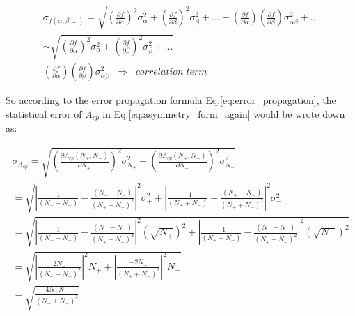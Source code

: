 		\begin{equation}
		\begin{split}
		\sigma_{f(\alpha,\beta,\ldots)} = \sqrt{  (\frac{\partial f}{\partial \alpha})^2 \sigma_{\alpha}^2 + (\frac{\partial f}{\partial \beta})^2 \sigma_{\beta}^2 + \ldots + (\frac{\partial f}{\partial \alpha})(\frac{\partial f}{\partial \beta})\sigma_{\alpha \beta}^2 + \ldots } \\
		\sim \sqrt{  (\frac{\partial f}{\partial \alpha})^2 \sigma_{\alpha}^2 + (\frac{\partial f}{\partial \beta})^2 \sigma_{\beta}^2 + \ldots} \;\;\;\;\;\;\;\;\;\;\;\;\;\;\;\;\;\;\;\;\;\;\;\;\;\;\;\;\;\;\;\;\;\;\; \\
		(\frac{\partial f}{\partial \alpha})(\frac{\partial f}{\partial \beta})\sigma_{\alpha \beta}^2 \;\; \Rightarrow \;\; correlation\;term \;\;\;\;\;\;\;\;\;\;\;\;\;\;\;\;\;\;\;\;\;\;\;\
		\end{split}
		\label{eq:error_propagation}
		\end{equation}
		\FloatBarrier

		So according to the error propagation formula Eq.\ref{eq:error_propagation}, the statistical error of $A_{cp}$ in Eq.\ref{eq:asymmetry_form_again} would be wrote down as:

		\begin{equation}
		\begin{split}
		\sigma_{A_{cp}} = \sqrt{ (\frac{\partial A_{cp}(N_+,N_-)}{\partial N_+})^2 \sigma_{N_+}^2 + (\frac{\partial A_{cp}(N_+,N_-)}{\partial N_-})^2 \sigma_{N_-}^2  } \;\;\;\;\;\;\;\;\;\;\;\;\;\;\;\;\;\;\;\;\;\;\;\;\;\;\;\;\;\;\;\;\;\;\; \\
		= \sqrt{ \left\rvert \frac{1}{(N_+ + N_-)} - \frac{(N_+ - N_-)}{(N_+ + N_-)^2} \right\rvert^2 \sigma_+^2 + \left\rvert \frac{-1}{(N_+ + N_-)} - \frac{(N_+ - N_-)}{(N_+ + N_-)^2} \right\rvert^2 \sigma_-^2 } \;\;\;\;\;\;\;\;\;\;\;\;\;\;\;\; \\
		= \sqrt{ \left\rvert \frac{1}{(N_+ + N_-)} - \frac{(N_+ - N_-)}{(N_+ + N_-)^2} \right\rvert^2 (\sqrt{N_+})^2 + \left\rvert \frac{-1}{(N_+ + N_-)} - \frac{(N_+ - N_-)}{(N_+ + N_-)^2} \right\rvert^2 (\sqrt{N_-})^2 } \\
		= \sqrt{ \left\rvert \frac{2N_-}{(N_+ + N_-)^2} \right\rvert^2 N_+ + \left\rvert \frac{-2N_+}{(N_+ + N_-)^2} \right\rvert^2 N_- } \;\;\;\;\;\;\;\;\;\;\;\;\;\;\;\;\;\;\;\;\;\;\;\;\;\;\;\;\;\;\;\;\;\;\; \\
		= \sqrt{ \frac{4N_+ N_-}{( N_+ + N_- )^3}} \;\;\;\;\;\;\;\;\;\;\;\;\;\;\;\;\;\;\;\;\;\;\;\;\;\;\;\;\;\;\;\;\;\;\;\;\;\;\;\;\;\;\;\;\;\;\;\;\;\;\;\;\;\;\;\;\;\;\;\;\;\;\;\;\;\;\;\;\;\;\;\;\;\;\;\;\;
		\end{split}
		\label{eq:error_propagation_Acp}
		\end{equation}
		\FloatBarrier

